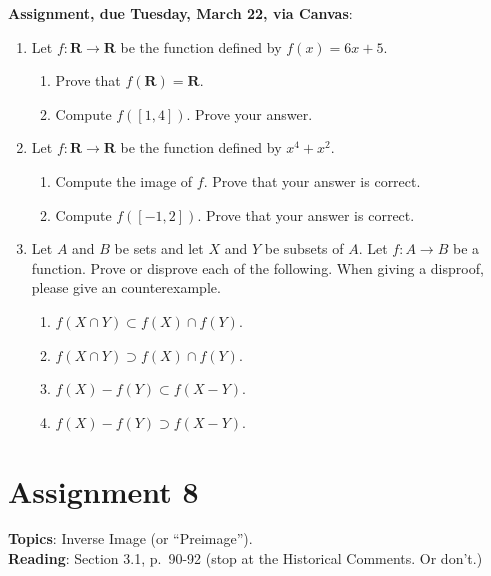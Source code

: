 \documentclass[12pt]{article}
\begin{document}
\noindent \textbf{Assignment, due Tuesday, March 22, via Canvas}:
\begin{enumerate}

\item Let $f \colon \mathbf{R} \to \mathbf{R}$ be the function defined by $f(x) = 6x+5$.
 \begin{enumerate}
 \item Prove that $f(\mathbf{R}) = \mathbf{R}$.
 \item Compute $f([1,4])$. Prove your answer.
 \end{enumerate}
\item Let $f \colon \mathbf{R} \to \mathbf{R}$ be the function defined by $x^4 + x^2$. 
 \begin{enumerate}
 \item Compute the image of $f$. Prove that your answer is correct.
 \item Compute $f([-1,2])$. Prove that your answer is correct.
\end{enumerate}

\item Let $A$ and $B$ be sets and let $X$ and $Y$ be subsets of $A$. Let $f\colon A \to B$ be a function. Prove or disprove each of the following. When giving a disproof, please give an counterexample.
 \begin{enumerate}

  \item $f(X \cap Y) \subset f(X) \cap f(Y)$.
  \item $f(X \cap Y) \supset f(X) \cap f(Y)$.
  \item $f(X) - f(Y) \subset f(X - Y)$.
  \item $f(X) - f(Y) \supset f(X - Y)$.

 \end{enumerate}

 

\end{enumerate}


\newpage
\section[8 (due March 29): Inverse Image (or ``Preimage'').]{Assignment 8}

\textbf{Topics}: Inverse Image (or ``Preimage'').
\\

\noindent \textbf{Reading}: Section 3.1, p.~90-92 (stop at the Historical Comments. Or don't.)
\\
\end{document}
